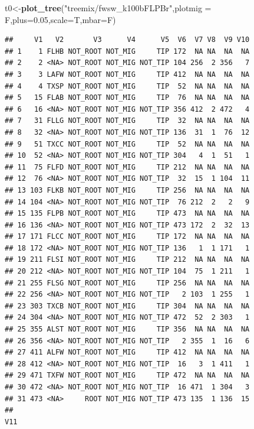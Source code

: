 \documentclass[]{article}
\newenvironment{Shaded}{\begin{snugshade}}{\end{snugshade}}
\newcommand{\KeywordTok}[1]{\textcolor[rgb]{0.13,0.29,0.53}{\textbf{#1}}}
\newcommand{\DataTypeTok}[1]{\textcolor[rgb]{0.13,0.29,0.53}{#1}}
\newcommand{\FloatTok}[1]{\textcolor[rgb]{0.00,0.00,0.81}{#1}}
\newcommand{\StringTok}[1]{\textcolor[rgb]{0.31,0.60,0.02}{#1}}
\newcommand{\NormalTok}[1]{#1}
\begin{document}
\begin{Shaded}
\begin{Highlighting}[]
\NormalTok{t0<-}\KeywordTok{plot_tree}\NormalTok{(}\StringTok{"treemix/fwsw_k100bFLPBr"}\NormalTok{,}\DataTypeTok{plotmig =}\NormalTok{ F,}\DataTypeTok{plus=}\FloatTok{0.05}\NormalTok{,}\DataTypeTok{scale=}\NormalTok{T,}\DataTypeTok{mbar=}\NormalTok{F)}
\end{Highlighting}
\end{Shaded}

\begin{verbatim}
##     V1   V2       V3      V4      V5  V6  V7 V8  V9 V10
## 1    1 FLHB NOT_ROOT NOT_MIG     TIP 172  NA NA  NA  NA
## 2    2 <NA> NOT_ROOT NOT_MIG NOT_TIP 104 256  2 356   7
## 3    3 LAFW NOT_ROOT NOT_MIG     TIP 412  NA NA  NA  NA
## 4    4 TXSP NOT_ROOT NOT_MIG     TIP  52  NA NA  NA  NA
## 5   15 FLAB NOT_ROOT NOT_MIG     TIP  76  NA NA  NA  NA
## 6   16 <NA> NOT_ROOT NOT_MIG NOT_TIP 356 412  2 472   4
## 7   31 FLLG NOT_ROOT NOT_MIG     TIP  32  NA NA  NA  NA
## 8   32 <NA> NOT_ROOT NOT_MIG NOT_TIP 136  31  1  76  12
## 9   51 TXCC NOT_ROOT NOT_MIG     TIP  52  NA NA  NA  NA
## 10  52 <NA> NOT_ROOT NOT_MIG NOT_TIP 304   4  1  51   1
## 11  75 FLFD NOT_ROOT NOT_MIG     TIP 212  NA NA  NA  NA
## 12  76 <NA> NOT_ROOT NOT_MIG NOT_TIP  32  15  1 104  11
## 13 103 FLKB NOT_ROOT NOT_MIG     TIP 256  NA NA  NA  NA
## 14 104 <NA> NOT_ROOT NOT_MIG NOT_TIP  76 212  2   2   9
## 15 135 FLPB NOT_ROOT NOT_MIG     TIP 473  NA NA  NA  NA
## 16 136 <NA> NOT_ROOT NOT_MIG NOT_TIP 473 172  2  32  13
## 17 171 FLCC NOT_ROOT NOT_MIG     TIP 172  NA NA  NA  NA
## 18 172 <NA> NOT_ROOT NOT_MIG NOT_TIP 136   1  1 171   1
## 19 211 FLSI NOT_ROOT NOT_MIG     TIP 212  NA NA  NA  NA
## 20 212 <NA> NOT_ROOT NOT_MIG NOT_TIP 104  75  1 211   1
## 21 255 FLSG NOT_ROOT NOT_MIG     TIP 256  NA NA  NA  NA
## 22 256 <NA> NOT_ROOT NOT_MIG NOT_TIP   2 103  1 255   1
## 23 303 TXCB NOT_ROOT NOT_MIG     TIP 304  NA NA  NA  NA
## 24 304 <NA> NOT_ROOT NOT_MIG NOT_TIP 472  52  2 303   1
## 25 355 ALST NOT_ROOT NOT_MIG     TIP 356  NA NA  NA  NA
## 26 356 <NA> NOT_ROOT NOT_MIG NOT_TIP   2 355  1  16   6
## 27 411 ALFW NOT_ROOT NOT_MIG     TIP 412  NA NA  NA  NA
## 28 412 <NA> NOT_ROOT NOT_MIG NOT_TIP  16   3  1 411   1
## 29 471 TXFW NOT_ROOT NOT_MIG     TIP 472  NA NA  NA  NA
## 30 472 <NA> NOT_ROOT NOT_MIG NOT_TIP  16 471  1 304   3
## 31 473 <NA>     ROOT NOT_MIG NOT_TIP 473 135  1 136  15
##                                                                                                                                                                                                                                                                                                                                                                                                                                 V11

\end{verbatim}
\end{document}
